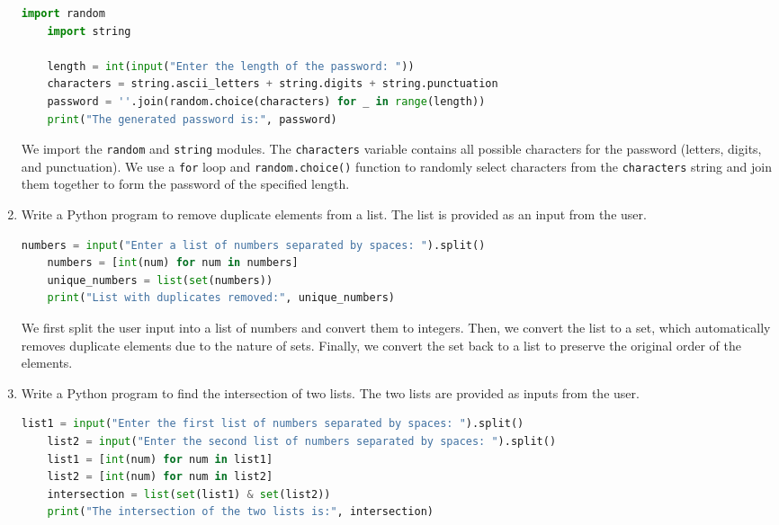 \documentclass[12pt]{book}
\begin{document}
\begin{enumerate}
    \begin{lstlisting}[language=Python]
    import random
    import string
    
    length = int(input("Enter the length of the password: "))
    characters = string.ascii_letters + string.digits + string.punctuation
    password = ''.join(random.choice(characters) for _ in range(length))
    print("The generated password is:", password)
    \end{lstlisting}
    
    We import the \texttt{random} and \texttt{string} modules. The \texttt{characters} variable contains all possible characters for the password (letters, digits, and punctuation). We use a \texttt{for} loop and \texttt{random.choice()} function to randomly select characters from the \texttt{characters} string and join them together to form the password of the specified length.
    
    \item Write a Python program to remove duplicate elements from a list. The list is provided as an input from the user.
    
    \begin{lstlisting}[language=Python]
    numbers = input("Enter a list of numbers separated by spaces: ").split()
    numbers = [int(num) for num in numbers]
    unique_numbers = list(set(numbers))
    print("List with duplicates removed:", unique_numbers)
    \end{lstlisting}
    
    We first split the user input into a list of numbers and convert them to integers. Then, we convert the list to a set, which automatically removes duplicate elements due to the nature of sets. Finally, we convert the set back to a list to preserve the original order of the elements.
    
    \item Write a Python program to find the intersection of two lists. The two lists are provided as inputs from the user.
    
    \begin{lstlisting}[language=Python]
    list1 = input("Enter the first list of numbers separated by spaces: ").split()
    list2 = input("Enter the second list of numbers separated by spaces: ").split()
    list1 = [int(num) for num in list1]
    list2 = [int(num) for num in list2]
    intersection = list(set(list1) & set(list2))
    print("The intersection of the two lists is:", intersection)
    \end{lstlisting}
    

\end{enumerate}
\end{document}
